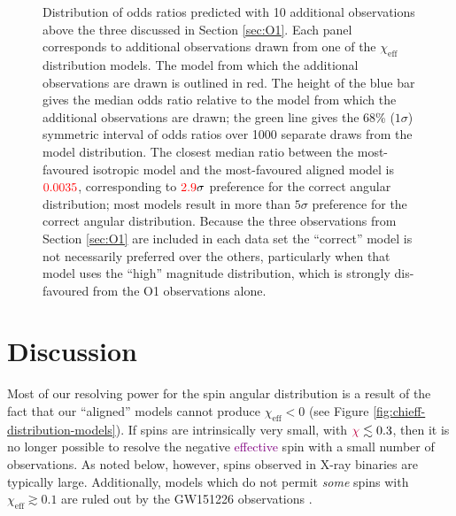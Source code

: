 \documentclass[modern,linenumbers]{aastex61}
\newcommand{\chieff}{\chi_\mathrm{eff}}
\newcommand{\checkme}[1]{\textcolor{red}{#1}}
\newcommand{\OTwoSigmaIsoAlignedMin}{\checkme{2.9}}
\newcommand{\OTwoOddsIsoAlignedMin}{\checkme{0.0035}}
\newcommand{\ilya}[1]{\textcolor{purple}{#1}}
\begin{document}
\begin{figure}
  \caption{\label{fig:O2-predictions} Distribution of odds ratios
    predicted with 10 additional observations above the three
    discussed in Section \ref{sec:O1}.  Each panel corresponds to
    additional observations drawn from one of the $\chieff$
    distribution models.  The model from which the additional
    observations are drawn is outlined in red.  The height of the blue
    bar gives the median odds ratio relative to the model from which
    the additional observations are drawn; the green line gives the
    68\% ($1 \sigma$) symmetric interval of odds ratios over 1000
    separate draws from the model distribution.  The closest median
    ratio between the most-favoured isotropic model and the
    most-favoured aligned model is $\OTwoOddsIsoAlignedMin$,
    corresponding to $\OTwoSigmaIsoAlignedMin\sigma$ preference for
    the correct angular distribution; most models result in more than
    $5\sigma$ preference for the correct angular distribution.
    Because the three observations from Section \ref{sec:O1} are
    included in each data set the ``correct'' model is not necessarily
    preferred over the others, particularly when that model uses the
    ``high'' magnitude distribution, which is strongly dis-favoured
    from the O1 observations alone.}
\end{figure}

\section{Discussion}
\label{sec:discussion}

Most of our resolving power for the spin angular distribution is a
result of the fact that our ``aligned'' models cannot produce
$\chieff < 0$ (see Figure \ref{fig:chieff-distribution-models}).  If
spins are intrinsically very small, with $\ilya{\chi} \lesssim 0.3$, then it is
no longer possible to resolve the negative \ilya{effective} spin with a small number of
observations.  As noted below, however, spins observed in X-ray
binaries are typically large.  Additionally, models which do not
permit \emph{some} spins with $\chieff \gtrsim 0.1$ are ruled out by
the GW151226 observations \citep{2016PhRvL.116x1103A}.
\end{document}
